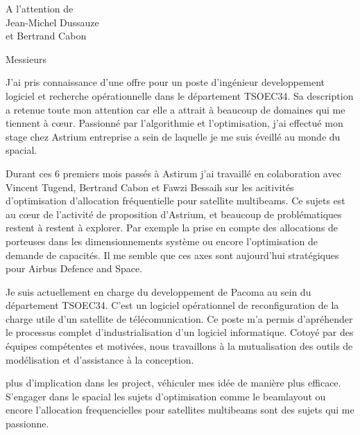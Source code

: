 \documentclass[12pt]{lettre}
\begin{document}
\begin{letter}{A l'attention de\\Jean-Michel Dussauze\\et Bertrand Cabon}
\address{Victor Cameo Ponz\\47 rue Guynemer\\31200 Toulouse}
\nofax

\opening{Messieurs}
J'ai pris connaissance d'une offre pour un poste d'ingénieur developpement logiciel et recherche opérationnelle dans le département TSOEC34.
Sa description a retenue toute mon attention car elle a attrait à beaucoup de domaines qui me tiennent à c\oe{}ur.
Passionné par l'algorithmie et l'optimisation, j'ai effectué mon stage chez Astrium entreprise a sein de laquelle je me suis éveillé au monde du spacial.

Durant ces 6 premiers mois passés à Astirum j'ai travaillé en colaboration
avec Vincent Tugend, Bertrand Cabon et Fawzi Bessaih sur les acitivités d'optimisation d'allocation fréquentielle pour satellite multibeams.
Ce sujets est au cœur de l'activité de proposition d'Astrium,
et beaucoup de problématiques restent à restent à explorer.
Par exemple la prise en compte des allocations de porteuses dans les
dimensionnements système ou encore l'optimisation de demande de capacités.
Il me semble que ces axes sont aujourd'hui stratégiques pour Airbus Defence and Space.

Je suis actuellement en charge du developpement de Pacoma au sein du département TSOEC34.
C'est un logiciel opérationnel de reconfiguration de la charge utile d'un satellite de télécomunication.
Ce poste m'a permis d'apréhender le processus complet d'industrialisation d'un logiciel informatique.
Cotoyé par des équipes compétentes et motivées, nous travaillons à la
mutualisation des outils de modélisation et d'assistance à la conception.

plus d'implication dans les project, véhiculer mes idée de manière plus efficace. S'engager dans le spacial
les sujets d'optimisation comme le beamlayout ou encore l'allocation frequencielles pour satellites multibeams sont des sujets qui me passionne.


\end{letter}
\end{document}
